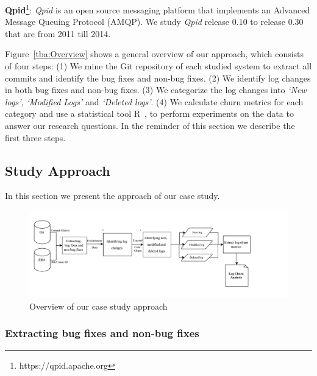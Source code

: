 {\textbf{Qpid}\footnote[3]{https://qpid.apache.org}}: \emph{Qpid} is an open source messaging platform that implements an Advanced Message Queuing Protocol (AMQP). We study \emph{Qpid} release $0.10$ to release $0.30$ that are from 2011 till 2014.


Figure~\ref{tba:Overview} shows a general overview of our approach, which consists of four steps: (1) We mine the Git repository of each studied system to extract all commits and identify the bug fixes and non-bug fixes. (2) We identify log changes in both bug fixes and non-bug fixes. (3) We categorize the log changes into \textsl{`New logs', `Modified Logs'} and \textsl{`Deleted logs'}. (4) We calculate churn metrics for each category and use a statistical tool R~\cite{ihaka1996r}, to perform experiments on the data to answer our research questions.  In the reminder of this section we describe the first three steps.



\subsection{Study Approach}

In this section we present the approach of our case study. 
\begin{figure}[tb]
	\centering
	\includegraphics[scale=0.45]{MethdologyICESEM}
	\caption{ Overview of our case study approach }
	\label{fig:MethodologyICSME}
\end{figure}

\subsubsection{Extracting bug fixes and non-bug fixes}

